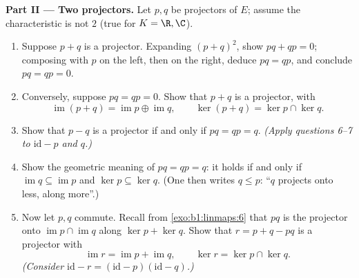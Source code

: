 \begin{problem}
\medskip
\noindent\textbf{Part II --- Two projectors.} Let $p, q$ be
projectors of $E$; assume the characteristic is not $2$ (true
for $K = \R, \C$).
\begin{enumerate}[resume]
  \item Suppose $p + q$ is a projector. Expanding $(p + q)^2$,
        show $pq + qp = 0$; composing with $p$ on the left, then
        on the right, deduce $pq = qp$, and conclude $pq = qp =
        0$.
  \item Conversely, suppose $pq = qp = 0$. Show that $p + q$ is a
        projector, with
        \[
        \operatorname{im}(p + q) = \operatorname{im} p \oplus
        \operatorname{im} q,
        \qquad
        \ker(p + q) = \ker p \cap \ker q .
        \]
  \item Show that $p - q$ is a projector if and only if $pq = qp
        = q$. \emph{(Apply questions 6--7 to $\mathrm{id} - p$
        and $q$.)}
  \item Show the geometric meaning of $pq = qp = q$: it holds if
        and only if $\operatorname{im} q \subseteq
        \operatorname{im} p$ and $\ker p \subseteq \ker q$. (One
        then writes $q \leq p$: ``$q$ projects onto less, along
        more''.)
  \item Now let $p, q$ commute. Recall from
        \cref{exo:b1:linmaps:6} that $pq$ is the projector onto
        $\operatorname{im} p \cap \operatorname{im} q$ along
        $\ker p + \ker q$. Show that $r = p + q - pq$ is a
        projector with
        \[
        \operatorname{im} r = \operatorname{im} p +
        \operatorname{im} q,
        \qquad
        \ker r = \ker p \cap \ker q .
        \]
        \emph{(Consider $\mathrm{id} - r = (\mathrm{id} -
        p)(\mathrm{id} - q)$.)}
\end{enumerate}


\end{problem}
